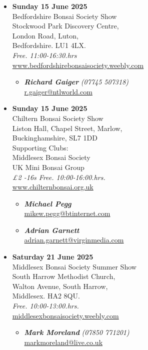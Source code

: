 \begin{itemize}
    \item \textbf{Sunday 15 June 2025}
    \\
    Bedfordshire Bonsai Society Show \\
    Stockwood Park Discovery Centre, \\
    London Road, Luton, \\
    Bedfordshire. LU1 4LX.
    \\
    \emph{Free. 11:00-16:30.hrs}
    \\
    \href{https://www.bedfordshirebonsaisociety.weebly.com}{www.bedfordshirebonsaisociety.weebly.com}
    \begin{itemize}
        \item \textbf{\emph{Richard Gaiger}} \emph{(07745 507318)} \\
        \href{mailto:r.gaiger@ntlworld.com}{r.gaiger@ntlworld.com} 
    \end{itemize}

    \item \textbf{Sunday 15 June 2025}
    \\
    Chiltern Bonsai Society Show \\
    Liston Hall, Chapel Street, Marlow, \\
    Buckinghamshire, SL7 1DD \\
    Supporting Clubs: \\
    Middlesex Bonsai Society \\
    UK Mini Bonsai Group
    \\
    \emph{£2 -16s Free. 10:00-16:00.hrs.}
    \\
    \href{https://www.chilternbonsai.org.uk}{www.chilternbonsai.org.uk}
    \begin{itemize}
        \item \textbf{\emph{Michael Pegg}} \\
        \href{mailto:mikew.pegg@btinternet.com}{mikew.pegg@btinternet.com} 
        \item \textbf{\emph{Adrian Garnett}} \\
        \href{mailto:adrian.garnett@virginmedia.com}{adrian.garnett@virginmedia.com} 
    \end{itemize}

    \item \textbf{Saturday 21 June 2025}
    \\
    Middlesex Bonsai Society Summer Show \\
    South Harrow Methodist Church, \\
    Walton Avenue, South Harrow, \\
    Middlesex. HA2 8QU.
    \\
    \emph{Free. 10:00-13:00.hrs.}
    \\
    \href{https://middlesexbonsaisociety.weebly.com/}{middlesexbonsaisociety.weebly.com}
    \begin{itemize}
        \item \textbf{\emph{Mark Moreland}} \emph{(07850 771201)} \\
        \href{mailto:markmoreland@live.co.uk}{markmoreland@live.co.uk} 
    \end{itemize}


\end{itemize}

